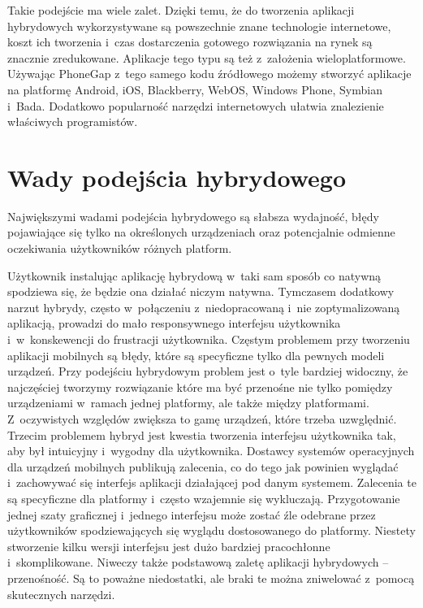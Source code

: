 \documentclass[brudnopis]{xmgr}
\begin{document}
Takie podejście ma wiele zalet. Dzięki temu, że do tworzenia aplikacji hybrydowych wykorzystywane są powszechnie znane technologie internetowe, koszt ich tworzenia i~czas dostarczenia
gotowego rozwiązania na rynek są znacznie zredukowane. Aplikacje tego typu są też
z~założenia wieloplatformowe. Używając PhoneGap z~tego samego kodu źródłowego
możemy stworzyć aplikacje na platformę Android, iOS, Blackberry, WebOS,
Windows Phone, Symbian i~Bada. Dodatkowo popularność narzędzi internetowych
ułatwia znalezienie właściwych programistów.

\section{Wady podejścia hybrydowego}
Największymi wadami podejścia hybrydowego są słabsza wydajność, błędy
pojawiające się tylko na określonych urządzeniach oraz potencjalnie odmienne oczekiwania użytkowników różnych platform. 

Użytkownik instalując aplikację hybrydową w~taki sam sposób co 
natywną spodziewa się, że będzie ona działać niczym natywna. Tymczasem
dodatkowy narzut hybrydy, często w~połączeniu z~niedopracowaną i~nie
zoptymalizowaną aplikacją, prowadzi do mało responsywnego interfejsu
użytkownika i~w~konskewencji do frustracji użytkownika. Częstym problemem przy
tworzeniu aplikacji mobilnych są błędy, które są specyficzne tylko dla pewnych modeli urządzeń. Przy podejściu hybrydowym problem jest o~tyle bardziej widoczny, że
najczęściej tworzymy rozwiązanie które ma być przenośne nie tylko pomiędzy urządzeniami w~ramach jednej platformy, ale także między platformami. Z~oczywistych względów zwiększa to gamę urządzeń, które trzeba uzwględnić. Trzecim problemem hybryd jest kwestia
tworzenia interfejsu użytkownika tak, aby był intuicyjny i~wygodny dla użytkownika. Dostawcy systemów operacyjnych dla urządzeń
mobilnych publikują zalecenia, co do tego jak powinien wyglądać i~zachowywać się interfejs aplikacji
działającej pod danym systemem. Zalecenia te są specyficzne dla platformy i~często
wzajemnie się wykluczają. Przygotowanie jednej szaty graficznej i~jednego interfejsu
może zostać źle odebrane przez użytkowników spodziewających się wyglądu
dostosowanego do platformy. Niestety stworzenie kilku wersji interfejsu jest dużo
bardziej pracochłonne i~skomplikowane. Niweczy także podstawową zaletę aplikacji
hybrydowych – przenośność. 
Są to poważne niedostatki, ale braki te można zniwelować z~pomocą skutecznych narzędzi.
\end{document}

